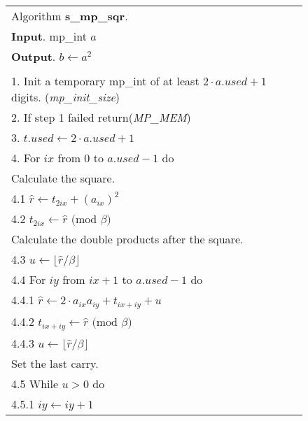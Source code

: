 \documentclass[b5paper]{book}
\begin{document}
\newpage\begin{figure}[!here]
\begin{small}
\begin{center}
\begin{tabular}{l}
\hline Algorithm \textbf{s\_mp\_sqr}. \\
\textbf{Input}.   mp\_int $a$ \\
\textbf{Output}.  $b \leftarrow a^2$ \\
\hline \\
1.  Init a temporary mp\_int of at least $2 \cdot a.used +1$ digits.  (\textit{mp\_init\_size}) \\
2.  If step 1 failed return(\textit{MP\_MEM}) \\
3.  $t.used \leftarrow 2 \cdot a.used + 1$ \\
4.  For $ix$ from 0 to $a.used - 1$ do \\
\hspace{3mm}Calculate the square. \\
\hspace{3mm}4.1  $\hat r \leftarrow t_{2ix} + \left (a_{ix} \right )^2$ \\
\hspace{3mm}4.2  $t_{2ix} \leftarrow \hat r \mbox{ (mod }\beta\mbox{)}$ \\
\hspace{3mm}Calculate the double products after the square. \\
\hspace{3mm}4.3  $u \leftarrow \lfloor \hat r / \beta \rfloor$ \\
\hspace{3mm}4.4  For $iy$ from $ix + 1$ to $a.used - 1$ do \\
\hspace{6mm}4.4.1  $\hat r \leftarrow 2 \cdot a_{ix}a_{iy} + t_{ix + iy} + u$ \\
\hspace{6mm}4.4.2  $t_{ix + iy} \leftarrow \hat r \mbox{ (mod }\beta\mbox{)}$ \\
\hspace{6mm}4.4.3  $u \leftarrow \lfloor \hat r / \beta \rfloor$ \\
\hspace{3mm}Set the last carry. \\
\hspace{3mm}4.5  While $u > 0$ do \\
\hspace{6mm}4.5.1  $iy \leftarrow iy + 1$ \\

\end{tabular}
\end{center}
\end{small}
\end{figure}
\end{document}
